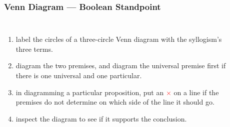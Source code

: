 \documentclass[UTF8,11pt,colorlinks,compress,openany]{beamer}%
\begin{document}
\begin{frame}\frametitle{Venn Diagram --- Boolean Standpoint}
		\begin{columns}
				\begin{enumerate}
					\item label the circles of a three-circle Venn diagram with the syllogism's three terms.
					\item diagram the two premises, and diagram the universal premise first if there is one universal and one particular.
					\item in diagramming a particular proposition, put an \textcolor{red}{$\times$} on a line if the premises do not determine on which side of the line it should go.
					\item inspect the diagram to see if it supports the conclusion.
				\end{enumerate}
				\begin{prooftree}
					\noLine
					\alwaysSingleLine
				\end{prooftree}
				\begin{center}
				\end{center}
		\end{columns}
\end{frame}
\end{document}
